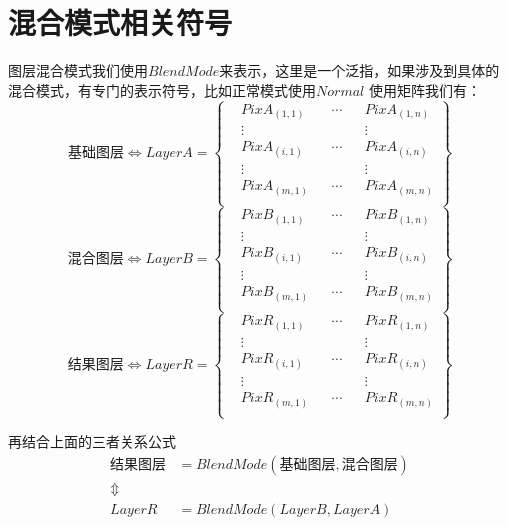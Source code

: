 \section{ 混合模式相关符号}
\indent 图层混合模式我们使用$BlendMode$来表示，这里是一个泛指，如果涉及到具体的混合模式，有专门的表示符号，比如正常模式使用$Normal$
使用矩阵我们有：
\begin{equation}
	\text{基础图层}\Longleftrightarrow LayerA=\left\{ \begin{aligned}     &PixA_{(1,1)}&&\cdots&&PixA_{(1,n)}\\&\vdots && &&\vdots\\  &PixA_{(i,1)} &&\cdots&&PixA_{(i,n)}\\&\vdots && &&\vdots\\  &PixA_{(m,1)} &&\cdots&&PixA_{(m,n)}\\  \end{aligned}\right\}
\end{equation}
\begin{equation}\text{混合图层}\Longleftrightarrow LayerB=\left\{ \begin{aligned}     &PixB_{(1,1)}&&\cdots&&PixB_{(1,n)}\\&\vdots && &&\vdots\\  &PixB_{(i,1)} &&\cdots&&PixB_{(i,n)}\\&\vdots && &&\vdots\\  &PixB_{(m,1)} &&\cdots&&PixB_{(m,n)}\\ \end{aligned}\right\}\end{equation}
\begin{equation}\text{结果图层}\Longleftrightarrow LayerR=\left\{ \begin{aligned}     &PixR_{(1,1)}&&\cdots&&PixR_{(1,n)}\\&\vdots && &&\vdots\\  &PixR_{(i,1)} &&\cdots&&PixR_{(i,n)}\\&\vdots && &&\vdots\\  &PixR_{(m,1)} &&\cdots&&PixR_{(m,n)}\\ \end{aligned}\right\}\end{equation}

再结合上面的三者关系公式
\begin{equation}\begin{aligned}
	\text{结果图层}&=BlendMode(\text{基础图层},\text{混合图层})\\\Updownarrow\\LayerR&=BlendMode(LayerB,LayerA)
	\end{aligned}\end{equation}

